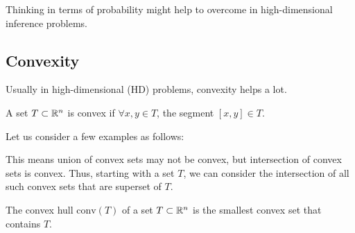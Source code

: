 \documentclass[12pt]{article}
\begin{document}
\begin{note}
    Thinking in terms of probability might help to overcome in high-dimensional inference problems.
\end{note}


\subsection{Convexity}

Usually in high-dimensional (HD) problems, convexity helps a lot.

\begin{definitionbox}
    A set $T \subset \mathbb{R}^n$ is convex if $\forall x,y \in T$, the segment $[x,y] \in T$.
\end{definitionbox}

Let us consider a few examples as follows:









This means union of convex sets may not be convex, but intersection of convex sets is convex. Thus, starting with a set $T$, we can consider the intersection of all such convex sets that are superset of $T$.

\begin{definitionbox}
    The convex hull $\text{conv}(T)$ of a set $T \subset \mathbb{R}^n$ is the smallest convex set that contains $T$.
\end{definitionbox}
\end{document}
